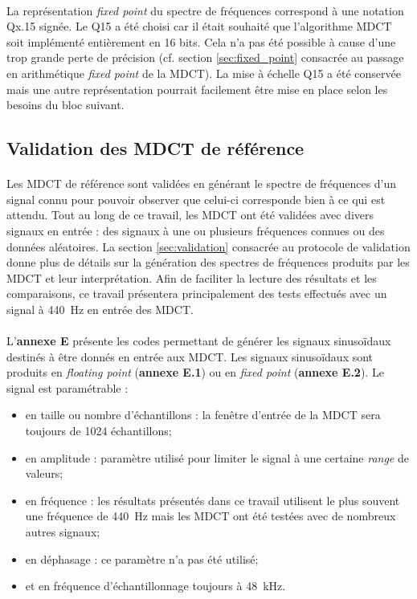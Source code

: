 \documentclass{article}
\begin{document}
    \paragraph{}
    La représentation \emph{fixed point} du spectre de fréquences correspond à une notation Qx.15 signée. Le Q15 a été choisi car il était souhaité que l'algorithme MDCT soit implémenté entièrement en 16 bits. Cela n'a pas été possible à cause d'une trop grande perte de précision (cf. section \ref{sec:fixed_point} consacrée au passage en arithmétique \emph{fixed point} de la MDCT). La mise à échelle Q15 a été conservée mais une autre représentation pourrait facilement être mise en place selon les besoins du bloc suivant.


    \subsection{Validation des MDCT de référence}

    \paragraph{}
    Les MDCT de référence sont validées en générant le spectre de fréquences d'un signal connu pour pouvoir observer que celui-ci corresponde bien à ce qui est attendu. Tout au long de ce travail, les MDCT ont été validées avec divers signaux en entrée : des signaux à une ou plusieurs fréquences connues ou des données aléatoires. La section \ref{sec:validation} consacrée au protocole de validation donne plus de détails sur la génération des spectres de fréquences produits par les MDCT et leur interprétation. Afin de faciliter la lecture des résultats et les comparaisons, ce travail présentera principalement des tests effectués avec un signal à \SI{440}{\hertz} en entrée des MDCT.

    \paragraph{}
    L'\textbf{annexe E} présente les codes permettant de générer les signaux sinusoïdaux destinés à être donnés en entrée aux MDCT. Les signaux sinusoïdaux sont produits en \emph{floating point} (\textbf{annexe E.1}) ou en \emph{fixed point} (\textbf{annexe E.2}). Le signal est paramétrable :
    \begin{itemize}
        \item en taille ou nombre d'échantillons : la fenêtre d'entrée de la MDCT sera toujours de 1024 échantillons;
        \item en amplitude : paramètre utilisé pour limiter le signal à une certaine \emph{range} de valeurs;
        \item en fréquence : les résultats présentés dans ce travail utilisent le plus souvent une fréquence de \SI{440}{\hertz} mais les MDCT ont été testées avec de nombreux autres signaux;
        \item en déphasage : ce paramètre n'a pas été utilisé;
        \item et en fréquence d'échantillonnage toujours à \SI{48}{\kilo\hertz}.
    \end{itemize}
\end{document}
